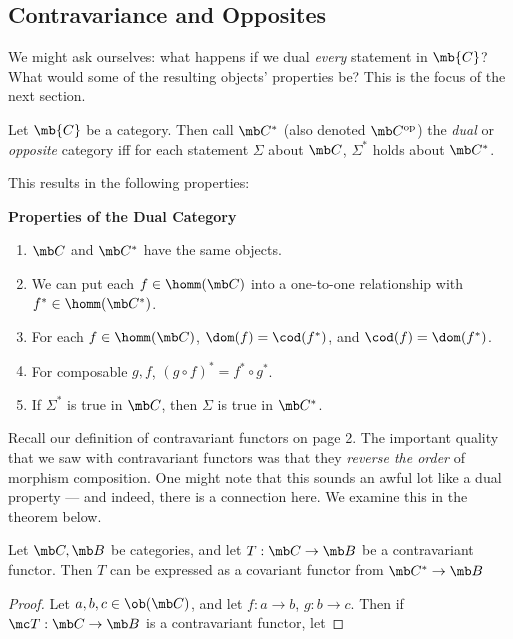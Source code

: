 \documentclass{fkbook}
\theoremstyle{snazzydefinition}
\begin{document}
\begin{adjustwidth}{1em}{1em}
  \subsection{Contravariance and Opposites}
  We might ask ourselves: what happens if we dual \emph{every}
  statement in $\mb{C}$? What would some of the resulting objects'
  properties be? This is the focus of the next section.
  \begin{definition}
    Let $\mb{C}$ be a category. Then call $\mb C^*$ (also denoted
    $\mb C^{\rm op}$) the \emph{dual} or \emph{opposite} category iff
    for each statement $\Sigma$ about $\mb C$, $\Sigma^*$ holds about
    $\mb C^*$.
  \end{definition}
  This results in the following properties:
  \begin{leftbar}
    {\large \bfseries Properties of the Dual Category}
    \begin{enumerate}[label=\arabic*)]
      \item $\mb C$ and $\mb C^*$ have the same objects.
      \item We can put each $f \in \homm(\mb C)$ into a one-to-one
        relationship with $f^* \in \homm(\mb C^*)$.
      \item For each $f \in \homm(\mb C)$, $\dom(f) = \cod(f^*)$, and
        $\cod(f) = \dom(f^*)$.
      \item For composable $g,f$, $(g \circ f)^* = f^* \circ g^*$.
      \item If $\Sigma^*$ is true in $\mb C$, then $\Sigma$ is true in
        $\mb C^*$.
    \end{enumerate}
  \end{leftbar}
  Recall our definition of contravariant functors on page 2. The
  important quality that we saw with contravariant functors was that
  they \emph{reverse the order} of morphism composition. One might
  note that this sounds an awful lot like a dual property --- and
  indeed, there is a connection here. We examine this in the theorem
  below.
  \begin{theorem}
    Let $\mb C, \mb B$ be categories, and let $T : \mb C \to \mb B$ be
    a contravariant functor. Then $T$ can be expressed as a covariant
    functor from $\mb C^* \to \mb B$
  \end{theorem}
  \begin{proof}
    Let $a,b,c \in \ob(\mb C)$, and let $f : a \to b$, $g : b \to c$.
    Then if $\mc T : \mb C \to \mb B$ is a contravariant functor, let

\end{proof}
\end{adjustwidth}
\end{document}
